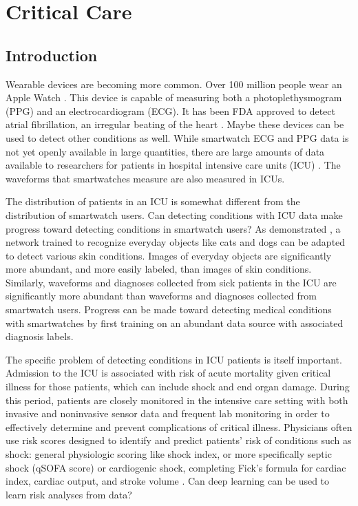 \chapter{Critical Care}

\section{Introduction}
Wearable devices are becoming more common.  Over 100 million people wear an Apple Watch \cite{cybart_2021}.  This device is capable of measuring both a photoplethysmogram (PPG) and an electrocardiogram (ECG).  It has been FDA approved to detect atrial fibrillation, an irregular beating of the heart \cite{perez2019large}.  Maybe these devices can be used to detect other conditions as well.  While smartwatch ECG and PPG data is not yet openly available in large quantities, there are large amounts of data available to researchers for patients in hospital intensive care units (ICU) \cite{johnson2016mimic}.  The waveforms that smartwatches measure are also measured in ICUs.

The distribution of patients in an ICU is somewhat different from the distribution of smartwatch users.  Can detecting conditions with ICU data make progress toward detecting conditions in smartwatch users?  As demonstrated \cite{kuprel2017dermatologist}, a network trained to recognize everyday objects like cats and dogs can be adapted to detect various skin conditions.  Images of everyday objects are significantly more abundant, and more easily labeled, than images of skin conditions.  Similarly, waveforms and diagnoses collected from sick patients in the ICU are significantly more abundant than waveforms and diagnoses collected from smartwatch users.  Progress can be made toward detecting medical conditions with smartwatches by first training on an abundant data source with associated diagnosis labels.  

The specific problem of detecting conditions in ICU patients is itself important.  Admission to the ICU is associated with risk of acute mortality given critical illness for those patients, which can include shock and end organ damage. During this period, patients are closely monitored in the intensive care setting with both invasive and noninvasive sensor data and frequent lab monitoring in order to effectively determine and prevent complications of critical illness.  Physicians often use risk scores designed to identify and predict patients’ risk of conditions such as shock: general physiologic scoring like shock index, or more specifically septic shock (qSOFA score) \cite{seymour2016assessment} or cardiogenic shock, completing Fick’s formula for cardiac index, cardiac output, and stroke volume \cite{fick1870ueber}.  Can deep learning can be used to learn risk analyses from data?


